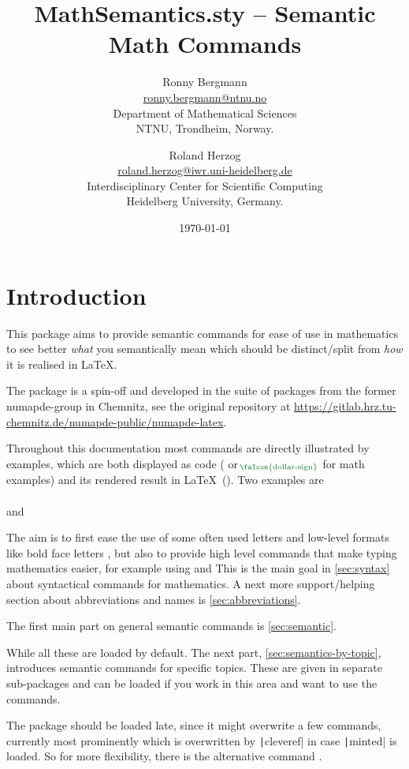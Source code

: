 \documentclass[english,a4paper,DIV=12,parskip=full,oneside]{scrartcl}
\date{\today}
\author{%
    Ronny Bergmann\\[.25\baselineskip]%
    \small\href{mailto:ronny.bergmann@ntnu.no}{ronny.bergmann@ntnu.no}\\[.125\baselineskip]
    \small Department of Mathematical Sciences\\%
    \small NTNU, Trondheim, Norway.%
    \and
    Roland Herzog\\[.25\baselineskip]%
    \small\href{mailto:roland.herzog@iwr.uni-heidelberg.de}{roland.herzog@iwr.uni-heidelberg.de}\\[.125\baselineskip]
    \small Interdisciplinary Center for Scientific Computing\\%
    \small Heidelberg University, Germany.%
    }
\title{MathSemantics.sty – Semantic Math Commands}
\begin{document}
    \maketitle
    \tableofcontents
    \section{Introduction}
    This package aims to provide semantic commands for ease of use in mathematics
    to see better \emph{what} you semantically mean which should be distinct/split
    from \emph{how} it is realised in \LaTeX.

    The package is a spin-off and developed in the suite of packages from the former numapde-group in Chemnitz,
    see the original repository at \url{https://gitlab.hrz.tu-chemnitz.de/numapde-public/numapde-latex}.

    Throughout this documentation most commands are directly illustrated by examples, which are
    both displayed as code ( or $_{\hspace{-.5ex}\text{\color{TolMutedGreen}\faIcon{dollar-sign}}}$ for math examples) and its rendered result in \LaTeX\ (\faEye[regular]).
    Two examples are\\
    \mathCodeExample{\bbR}\\
    and\\
    \codeExample{\eg}

    The aim is to first ease the use of some often used letters and low-level formats like
    bold face letters \mathCodeExample{\bbR}, but also to provide high level commands that
    make typing mathematics easier, for example using  and  
    This is the main goal in \cref{sec:syntax} about syntactical commands for mathematics.
    A next more support/helping section about abbreviations and names is \cref{sec:abbreviations}.

    The first main part on general semantic commands is \cref{sec:semantic}.

    While all these are loaded by default. The next part, \cref{sec:semantics-by-topic},
    introduces semantic commands for specific topics.
    These are given in separate sub-packages and can be loaded if you work in this area and want to use the commands.

    The package should be loaded late, since it might overwrite a few commands,
    currently most prominently \codeCommand{\d} which is overwritten by \texttt|cleveref| in case \texttt|minted| is loaded.
    So for more flexibility, there is the alternative command \codeCommand{\dInt}.
\end{document}
